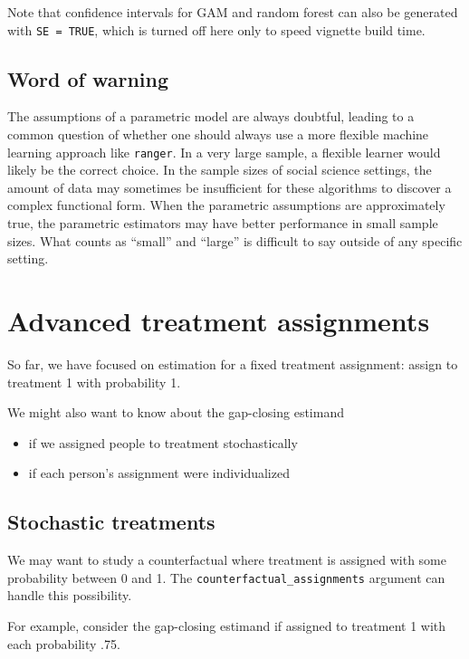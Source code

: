 \documentclass[
]{article}
\providecommand{\tightlist}{%
  \setlength{\itemsep}{0pt}\setlength{\parskip}{0pt}}
\begin{document}
Note that confidence intervals for GAM and random forest can also be generated with \texttt{SE\ =\ TRUE}, which is turned off here only to speed vignette build time.

\subsection{Word of warning}\label{word-of-warning}

The assumptions of a parametric model are always doubtful, leading to a common question of whether one should always use a more flexible machine learning approach like \texttt{ranger}. In a very large sample, a flexible learner would likely be the correct choice. In the sample sizes of social science settings, the amount of data may sometimes be insufficient for these algorithms to discover a complex functional form. When the parametric assumptions are approximately true, the parametric estimators may have better performance in small sample sizes. What counts as ``small'' and ``large'' is difficult to say outside of any specific setting.

\section{Advanced treatment assignments}\label{advanced-treatment-assignments}

So far, we have focused on estimation for a fixed treatment assignment: assign to treatment 1 with probability 1.

We might also want to know about the gap-closing estimand

\begin{itemize}
\tightlist
\item
  if we assigned people to treatment stochastically
\item
  if each person's assignment were individualized
\end{itemize}

\subsection{Stochastic treatments}\label{stochastic-treatments}

We may want to study a counterfactual where treatment is assigned with some probability between 0 and 1. The \texttt{counterfactual\_assignments} argument can handle this possibility.

For example, consider the gap-closing estimand if assigned to treatment 1 with each probability .75.
\end{document}
